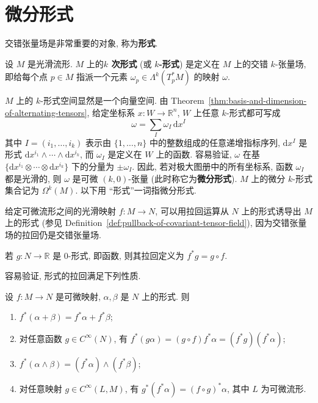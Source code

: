 \section{微分形式}\label{sec:differential-forms}

交错张量场是非常重要的对象, 称为\textbf{形式}.

\begin{RiemannDefinition}\label{def:differential-form}
设 $M$ 是光滑流形. $M$ 上的\textbf{$k$ 次形式} (或 \textbf{$k$-形式}) 是定义在 $M$ 上的交错 $k$-张量场, 即给每个点 $p\in M$ 指派一个元素 $\omega_p\in\Lambda^k(T_p^*M)$ 的映射 $\omega$.
\end{RiemannDefinition}

$M$ 上的 $k$-形式空间显然是一个向量空间. 由 Theorem~\ref{thm:basis-and-dimension-of-alternating-tensors}, 给定坐标系 $x:W\to\mathbb{R}^n$, $W$ 上任意 $k$-形式都可写成
\[
  \omega=\sum_I\omega_I\,\mathrm{d}x^I
\]
其中 $I=(i_1,\ldots,i_k)$ 表示由 $\{1,\ldots,n\}$ 中的整数组成的任意递增指标序列, $\mathrm{d}x^I$ 是形式 $\mathrm{d}x^{i_1}\wedge\cdots\wedge\mathrm{d}x^{i_k}$, 而 $\omega_I$ 是定义在 $W$ 上的函数. 容易验证, $\omega$ 在基 $\{\mathrm{d}x^{i_1}\otimes\cdots\otimes\mathrm{d}x^{i_k}\}$ 下的分量为 $\pm\omega_I$. 因此, 若对极大图册中的所有坐标系, 函数 $\omega_I$ 都是光滑的, 则 $\omega$ 是可微 $(k,0)$-张量 (此时称它为\textbf{微分形式}). $M$ 上的微分 $k$-形式集合记为 $\Omega^k(M)$. 以下用 \textquotedblleft 形式\textquotedblright 一词指微分形式.

给定可微流形之间的光滑映射 $f:M\to N$, 可以用拉回运算从 $N$ 上的形式诱导出 $M$ 上的形式 (参见 Definition~\ref{def:pullback-of-covariant-tensor-field}), 因为交错张量场的拉回仍是交错张量场.

\begin{RiemannRemark}\label{rem:pullback-of-zero-form}
若 $g:N\to\mathbb{R}$ 是 0-形式, 即函数, 则其拉回定义为 $f^*g=g\circ f$.
\end{RiemannRemark}

容易验证, 形式的拉回满足下列性质.

\begin{RiemannProposition}\label{prop:pullback-of-differential-forms}
设 $f:M\to N$ 是可微映射, $\alpha,\beta$ 是 $N$ 上的形式. 则
\begin{enumerate}[label=(\roman*),leftmargin=*]
\item $f^*(\alpha+\beta)=f^*\alpha+f^*\beta$;
\item 对任意函数 $g\in C^\infty(N)$, 有 $f^*(g\alpha)=(g\circ f)f^*\alpha=(f^*g)(f^*\alpha)$;
\item $f^*(\alpha\wedge\beta)=(f^*\alpha)\wedge(f^*\beta)$;
\item 对任意映射 $g\in C^\infty(L,M)$, 有 $g^*(f^*\alpha)=(f\circ g)^*\alpha$, 其中 $L$ 为可微流形.
\end{enumerate}
\end{RiemannProposition}

